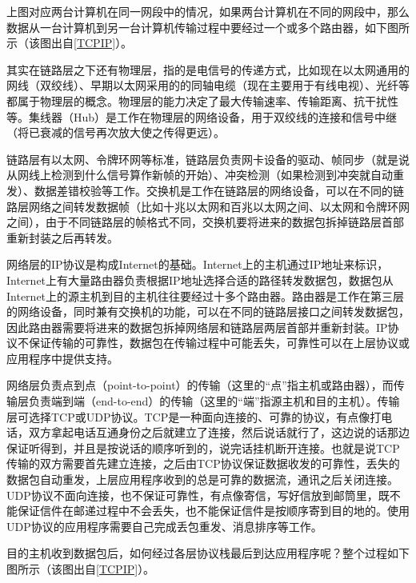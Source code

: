 上图对应两台计算机在同一网段中的情况，如果两台计算机在不同的网段中，那么数据从一台计算机到另一台计算机传输过程中要经过一个或多个路由器，如下图所示（该图出自\hyperlink{db.bi01.bibli.tcpip}{[TCPIP]}）。




其实在链路层之下还有物理层，指的是电信号的传递方式，比如现在以太网通用的网线（双绞线）、早期以太网采用的的同轴电缆（现在主要用于有线电视）、光纤等都属于物理层的概念。物理层的能力决定了最大传输速率、传输距离、抗干扰性等。集线器（Hub）是工作在物理层的网络设备，用于双绞线的连接和信号中继（将已衰减的信号再次放大使之传得更远）。



链路层有以太网、令牌环网等标准，链路层负责网卡设备的驱动、帧同步（就是说从网线上检测到什么信号算作新帧的开始）、冲突检测（如果检测到冲突就自动重发）、数据差错校验等工作。交换机是工作在链路层的网络设备，可以在不同的链路层网络之间转发数据帧（比如十兆以太网和百兆以太网之间、以太网和令牌环网之间），由于不同链路层的帧格式不同，交换机要将进来的数据包拆掉链路层首部重新封装之后再转发。



网络层的IP协议是构成Internet的基础。Internet上的主机通过IP地址来标识，Internet上有大量路由器负责根据IP地址选择合适的路径转发数据包，数据包从Internet上的源主机到目的主机往往要经过十多个路由器。路由器是工作在第三层的网络设备，同时兼有交换机的功能，可以在不同的链路层接口之间转发数据包，因此路由器需要将进来的数据包拆掉网络层和链路层两层首部并重新封装。IP协议不保证传输的可靠性，数据包在传输过程中可能丢失，可靠性可以在上层协议或应用程序中提供支持。



网络层负责点到点（point-to-point）的传输（这里的“点”指主机或路由器），而传输层负责端到端（end-to-end）的传输（这里的“端”指源主机和目的主机）。传输层可选择TCP或UDP协议。TCP是一种面向连接的、可靠的协议，有点像打电话，双方拿起电话互通身份之后就建立了连接，然后说话就行了，这边说的话那边保证听得到，并且是按说话的顺序听到的，说完话挂机断开连接。也就是说TCP传输的双方需要首先建立连接，之后由TCP协议保证数据收发的可靠性，丢失的数据包自动重发，上层应用程序收到的总是可靠的数据流，通讯之后关闭连接。UDP协议不面向连接，也不保证可靠性，有点像寄信，写好信放到邮筒里，既不能保证信件在邮递过程中不会丢失，也不能保证信件是按顺序寄到目的地的。使用UDP协议的应用程序需要自己完成丢包重发、消息排序等工作。



目的主机收到数据包后，如何经过各层协议栈最后到达应用程序呢？整个过程如下图所示（该图出自\hyperlink{db.bi01.bibli.tcpip}{[TCPIP]}）。


